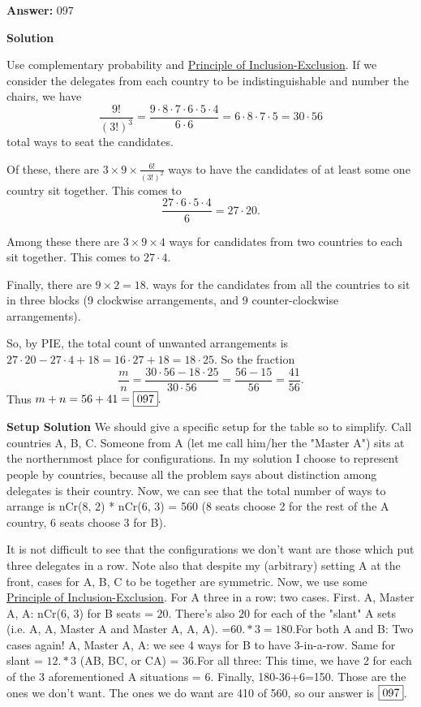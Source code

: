 \begin{enumerate}
 
 \textbf{Answer: }097



\textbf{Solution}

Use complementary probability and \href{https://artofproblemsolving.com/wiki/index.php?title=Principle\_of\_Inclusion-Exclusion}{Principle of Inclusion-Exclusion}. If we consider the delegates from each country to be indistinguishable and number the chairs, we have 
 \[\frac{9!}{(3!)^3} = \frac{9\cdot8\cdot7\cdot6\cdot5\cdot4}{6\cdot6} = 6\cdot8\cdot7\cdot5 = 30\cdot56\] total ways to seat the candidates. 

 Of these, there are $3 \times 9 \times \frac{6!}{(3!)^2}$ ways to have the candidates of at least some one country sit together. This comes to 
 \[\frac{27\cdot6\cdot5\cdot4}6 = 27\cdot 20.\]

 Among these there are $3 \times 9 \times 4$ ways for candidates from two countries to each sit together. This comes to $27\cdot 4.$

 Finally, there are $9 \times 2 = 18.$ ways for the candidates from all the countries to sit in three blocks (9 clockwise arrangements, and 9 counter-clockwise arrangements).

 So, by PIE, the total count of unwanted arrangements is $27\cdot 20 - 27\cdot 4 + 18 = 16\cdot27 + 18 = 18\cdot25.$ So the fraction 
 \[\frac mn = \frac{30\cdot 56 - 18\cdot 25}{30\cdot 56} = \frac{56 - 15}{56} = \frac{41}{56}.\] Thus $m + n = 56 + 41 = \fbox{097}.$

 


 \textbf{Setup Solution} We should give a specific setup for the table so to simplify. Call countries A, B, C. Someone from A (let me call him/her the "Master A") sits at the northernmost place for configurations. In my solution I choose to represent people by countries, because all the problem says about distinction among delegates is their country. Now, we can see that the total number of ways to arrange is nCr(8, 2) * nCr(6, 3) = 560 (8 seats choose 2 for the rest of the A country, 6 seats choose 3 for B).

 It is not difficult to see that the configurations we don't want are those which put three delegates in a row. Note also that despite my (arbitrary) setting A at the front, cases for A, B, C to be together are symmetric. Now, we use some \href{https://artofproblemsolving.com/wiki/index.php?title=Principle\_of\_Inclusion-Exclusion}{Principle of Inclusion-Exclusion}. For A three in a row: two cases. First. A, Master A, A: nCr(6, 3) for B seats = $20$. There's also $20$ for each of the "slant" A sets (i.e. A, A, Master A and Master A, A, A). =$60. *3=180$.For both A and B: Two cases again! A, Master A, A: we see 4 ways for B to have 3-in-a-row. Same for slant = $12. *3$ (AB, BC, or CA) = $36$.For all three: This time, we have 2 for each of the 3 aforementioned A situations = 6. Finally, 180-36+6=150. Those are the ones we don't want. The ones we do want are 410 of 560, so our answer is $\fbox{097}$.


\end{enumerate}
